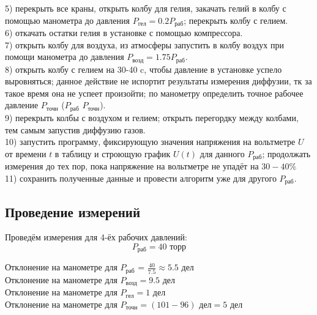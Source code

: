 \documentclass[a4paper]{article}
\begin{document}
5) перекрыть все краны, открыть колбу для гелия, закачать гелий в колбу с помощью манометра до давления $P_\text{гел} = 0.2 P_\text{раб}$; перекрыть колбу с гелием. \\

6) откачать остатки гелия в установке с помощью компрессора. \\

7) открыть колбу для воздуха, из атмосферы запустить в колбу воздух при помощи манометра до давления $P_\text{возд} = 1.75 P_\text{раб}$.  \\

8) открыть колбу с гелием на 30-40 c, чтобы давление в установке успело выровняться; данное действие не испортит результаты измерения диффузии, тк за такое время она не успеет произойти; по манометру определить точное рабочее давление $P_\text{точн}$ ($P_\text{раб}$ \approx $P_\text{точн}$).\\

9) перекрыть колбы с воздухом и гелием; открыть перегордку между колбами, тем самым запустив диффузию газов. \\

10) запустить программу, фиксирующую значения напряжения на вольтметре $U$ от времени $t$ в таблицу и строющую график $U(t)$ для данного $P_\text{раб}$;  продолжать измерения до тех пор, пока напряжение на вольтметре не упадёт на $30-40\%$\\

11) сохранить полученные данные и провести алгоритм уже для другого $P_\text{раб}$.

\subsection{Проведение измерений}

Проведём измерения для 4-ёх рабочих давлений:\\

\[P_\text{раб} = 40 \text{ торр}  \]

Отклонение на манометре для $P_\text{раб}$ = $\frac{40}{7.5} \approx 5.5 \text{ дел}$ \\

Отклонение на манометре для $P_\text{возд} = 9.5 \text{ дел}$ \\

Отклонение на манометре для $P_\text{гел} = 1 \text{ дел}$ \\

Отклонение на манометре для $P_\text{точн} = (101 - 96) \text{ дел} = 5 \text{ дел}$
\end{document}
